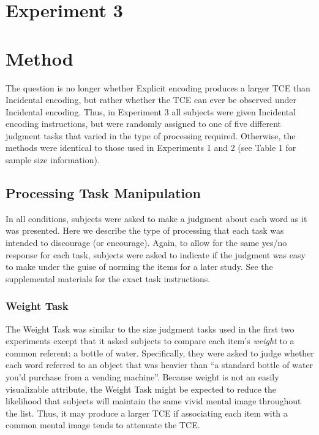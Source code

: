 \documentclass[jou,natbib]{apa6} %
\begin{document}




\section{Experiment 3}
\section{Method}
The question is no longer whether Explicit encoding produces a larger TCE than Incidental encoding, but rather whether the TCE can ever be observed under Incidental encoding. Thus, in Experiment 3 all subjects were given Incidental encoding instructions, but were randomly assigned to one of five different judgment tasks that varied in the type of processing required. Otherwise, the methods were identical to those used in Experiments 1 and 2 (see Table 1 for sample size information).

\subsection{Processing Task Manipulation}
In all conditions, subjects were asked to make a judgment about each word as it was presented. Here we describe the type of processing that each task was intended to discourage (or encourage). Again, to allow for the same yes/no response for each task, subjects were asked to indicate if the judgment was easy to make under the guise of norming the items for a later study. See the supplemental materials for the exact task instructions.

\subsubsection{Weight Task} The Weight Task was similar to the size judgment tasks used in the first two experiments except that it asked subjects to compare each item's \emph{weight} to a common referent: a bottle of water. Specifically, they were asked to judge whether each word referred to an object that was heavier than ``a standard bottle of water you'd purchase from a vending machine''. Because weight is not an easily visualizable attribute, the Weight Task might be expected to reduce the likelihood that subjects will maintain the same vivid mental image throughout the list. Thus, it may produce a larger TCE if associating each item with a common mental image tends to attenuate the TCE.
\end{document}
